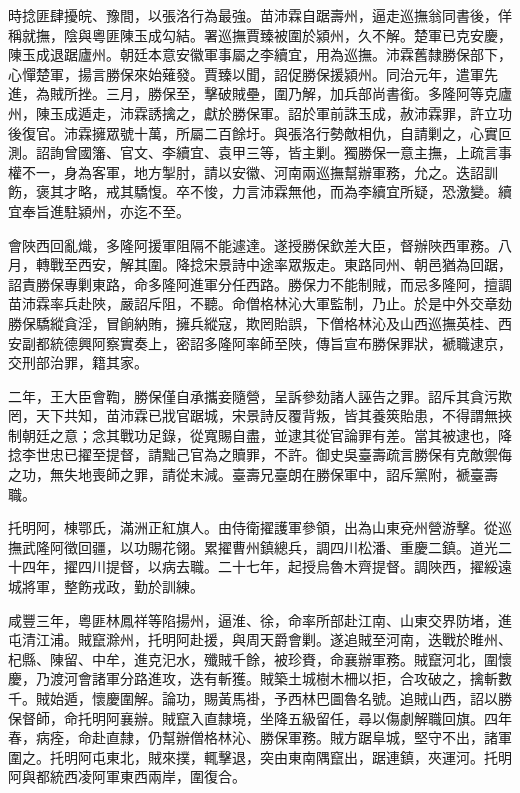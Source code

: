 \begin{pinyinscope}
時捻匪肆擾皖、豫間，以張洛行為最強。苗沛霖自踞壽州，逼走巡撫翁同書後，佯稱就撫，陰與粵匪陳玉成勾結。署巡撫賈臻被圍於潁州，久不解。楚軍已克安慶，陳玉成退踞廬州。朝廷本意安徽軍事屬之李續宜，用為巡撫。沛霖舊隸勝保部下，心憚楚軍，揚言勝保來始薙發。賈臻以聞，詔促勝保援潁州。同治元年，遣軍先進，為賊所挫。三月，勝保至，擊破賊壘，圍乃解，加兵部尚書銜。多隆阿等克廬州，陳玉成遁走，沛霖誘擒之，獻於勝保軍。詔於軍前誅玉成，赦沛霖罪，許立功後復官。沛霖擁眾號十萬，所屬二百餘圩。與張洛行勢敵相仇，自請剿之，心實叵測。詔詢曾國籓、官文、李續宜、袁甲三等，皆主剿。獨勝保一意主撫，上疏言事權不一，身為客軍，地方掣肘，請以安徽、河南兩巡撫幫辦軍務，允之。迭詔訓飭，褒其才略，戒其驕愎。卒不悛，力言沛霖無他，而為李續宜所疑，恐激變。續宜奉旨進駐潁州，亦迄不至。

會陜西回亂熾，多隆阿援軍阻隔不能遽達。遂授勝保欽差大臣，督辦陜西軍務。八月，轉戰至西安，解其圍。降捻宋景詩中途率眾叛走。東路同州、朝邑猶為回踞，詔責勝保專剿東路，命多隆阿進軍分任西路。勝保力不能制賊，而忌多隆阿，擅調苗沛霖率兵赴陜，嚴詔斥阻，不聽。命僧格林沁大軍監制，乃止。於是中外交章劾勝保驕縱貪淫，冒餉納賄，擁兵縱寇，欺罔貽誤，下僧格林沁及山西巡撫英桂、西安副都統德興阿察實奏上，密詔多隆阿率師至陜，傳旨宣布勝保罪狀，褫職逮京，交刑部治罪，籍其家。

二年，王大臣會鞫，勝保僅自承攜妾隨營，呈訴參劾諸人誣告之罪。詔斥其貪污欺罔，天下共知，苗沛霖已戕官踞城，宋景詩反覆背叛，皆其養筴貽患，不得謂無挾制朝廷之意；念其戰功足錄，從寬賜自盡，並逮其從官論罪有差。當其被逮也，降捻李世忠已擢至提督，請黜己官為之贖罪，不許。御史吳臺壽疏言勝保有克敵禦侮之功，無失地喪師之罪，請從末減。臺壽兄臺朗在勝保軍中，詔斥黨附，褫臺壽職。

托明阿，棟鄂氏，滿洲正紅旗人。由侍衛擢護軍參領，出為山東兗州營游擊。從巡撫武隆阿徵回疆，以功賜花翎。累擢曹州鎮總兵，調四川松潘、重慶二鎮。道光二十四年，擢四川提督，以病去職。二十七年，起授烏魯木齊提督。調陜西，擢綏遠城將軍，整飭戎政，勤於訓練。

咸豐三年，粵匪林鳳祥等陷揚州，逼淮、徐，命率所部赴江南、山東交界防堵，進屯清江浦。賊竄滁州，托明阿赴援，與周天爵會剿。遂追賊至河南，迭戰於睢州、杞縣、陳留、中牟，進克汜水，殲賊千餘，被珍賚，命襄辦軍務。賊竄河北，圍懷慶，乃渡河會諸軍分路進攻，迭有斬獲。賊築土城樹木柵以拒，合攻破之，擒斬數千。賊始遁，懷慶圍解。論功，賜黃馬褂，予西林巴圖魯名號。追賊山西，詔以勝保督師，命托明阿襄辦。賊竄入直隸境，坐降五級留任，尋以傷劇解職回旗。四年春，病痊，命赴直隸，仍幫辦僧格林沁、勝保軍務。賊方踞阜城，堅守不出，諸軍圍之。托明阿屯東北，賊來撲，輒擊退，突由東南隅竄出，踞連鎮，夾運河。托明阿與都統西凌阿軍東西兩岸，圍復合。


\end{pinyinscope}
